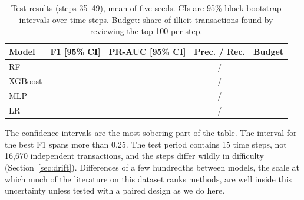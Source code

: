 \begin{table}[t]
  \centering
  \caption{Test results (steps 35--49), mean of five seeds. CIs are 95\%
  block-bootstrap intervals over time steps. Budget: share of illicit
  transactions found by reviewing the top 100 per step.}
  \label{tab:main}
  \setlength{\tabcolsep}{3pt}
  \footnotesize
  \begin{tabular}{lcccc}
    \toprule
    Model & F1 [95\% CI] & PR-AUC [95\% CI] & Prec. / Rec. & Budget \\
    \midrule
    RF      & \MainRFFone{}  {\scriptsize\MainRFFoneCI{}}  & \MainRFPRAUC{}  {\scriptsize\MainRFPRAUCCI{}}  & \MainRFPrecision{} / \MainRFRecall{}   & \MainRFBudget{} \\
    XGBoost & \MainXGBFone{} {\scriptsize\MainXGBFoneCI{}} & \MainXGBPRAUC{} {\scriptsize\MainXGBPRAUCCI{}} & \MainXGBPrecision{} / \MainXGBRecall{} & \MainXGBBudget{} \\
    MLP     & \MainMLPFone{} {\scriptsize\MainMLPFoneCI{}} & \MainMLPPRAUC{} {\scriptsize\MainMLPPRAUCCI{}} & \MainMLPPrecision{} / \MainMLPRecall{} & \MainMLPBudget{} \\
    LR      & \MainLRFone{}  {\scriptsize\MainLRFoneCI{}}  & \MainLRPRAUC{}  {\scriptsize\MainLRPRAUCCI{}}  & \MainLRPrecision{} / \MainLRRecall{}   & \MainLRBudget{} \\
    \bottomrule
  \end{tabular}
\end{table}

The confidence intervals are the most sobering part of the table. The interval
for the best F1 spans more than 0.25. The test period contains 15 time steps,
not 16,670 independent transactions, and the steps differ wildly in difficulty
(Section~\ref{sec:drift}). Differences of a few hundredths between models, the
scale at which much of the literature on this dataset ranks methods, are well
inside this uncertainty unless tested with a paired design as we do here.
